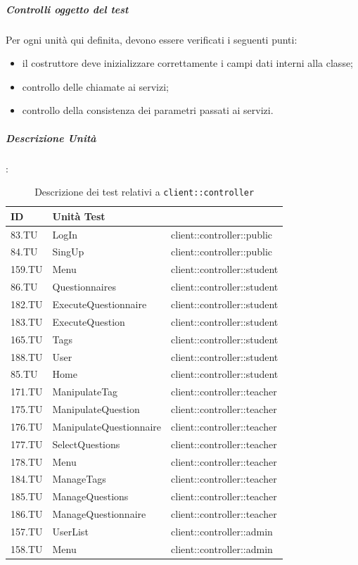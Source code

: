 \documentclass[12pt,a4paper]{article}
\begin{document}
\subparagraph{Controlli oggetto del test}
Per ogni unità  qui definita, devono essere verificati i seguenti punti:

\begin{itemize}
	\item il costruttore deve inizializzare correttamente i campi dati interni alla classe;
	\item controllo delle chiamate ai servizi;
	\item controllo della consistenza dei parametri passati ai servizi.
\end{itemize}

\newpage

\subparagraph{Descrizione Unità}:
\begin{table}[H]
	\begin{center}
		\begin{tabular}{p{} p{} p{}}
			\toprule
			\textbf{ID}   & \textbf{Unità Test}	& \textbf{\mgls{package}} \\ \midrule
			\midrule
			83.TU & LogIn & client::controller::public\\ \midrule
			84.TU & SingUp & client::controller::public\\ \midrule
			159.TU & Menu & client::controller::student\\ \midrule
			86.TU & Questionnaires & client::controller::student\\ \midrule
			182.TU & ExecuteQuestionnaire & client::controller::student\\ \midrule
			183.TU & ExecuteQuestion & client::controller::student\\ \midrule
			165.TU & Tags & client::controller::student\\ \midrule
			188.TU & User & client::controller::student\\ \midrule
			85.TU & Home & client::controller::student\\ \midrule
			171.TU & ManipulateTag & client::controller::teacher\\ \midrule
			175.TU & ManipulateQuestion & client::controller::teacher\\ \midrule
			176.TU & ManipulateQuestionnaire & client::controller::teacher\\ \midrule
			177.TU & SelectQuestions & client::controller::teacher\\ \midrule
			178.TU & Menu & client::controller::teacher\\ \midrule
			184.TU & ManageTags & client::controller::teacher\\ \midrule
			185.TU & ManageQuestions & client::controller::teacher\\ \midrule
			186.TU & ManageQuestionnaire & client::controller::teacher\\ \midrule
			157.TU & UserList & client::controller::admin\\ \midrule
			158.TU & Menu & client::controller::admin\\ \midrule			
		 \bottomrule
		\end{tabular}
	\end{center}
	\caption{Descrizione dei test relativi a \texttt{client::controller}}
\end{table}
\end{document}
